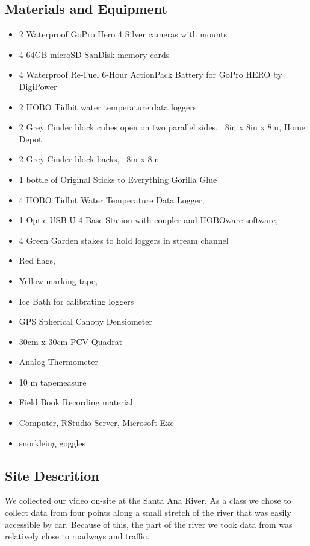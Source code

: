 \documentclass{article}\usepackage[]{graphicx}\usepackage[]{color}
\begin{document}
\subsection{Materials and Equipment}
\begin{itemize}
\item 2 Waterproof GoPro Hero 4 Silver cameras with mounts
\item 4 64GB microSD SanDisk memory cards
\item 4 Waterproof Re-Fuel 6-Hour ActionPack Battery for GoPro HERO by DigiPower
\item 2 HOBO Tidbit water temperature data loggers
\item 2 Grey Cinder block cubes open on two parallel sides, ~8in x 8in x 8in, Home Depot
\item 2 Grey Cinder block backs, ~8in x 8in
\item 1 bottle of Original Sticks to Everything Gorilla Glue
\item 4 HOBO Tidbit Water Temperature Data Logger,
\item 1 Optic USB U-4 Base Station with coupler and HOBOware software,
\item 4 Green Garden stakes to hold loggers in stream channel
\item Red flags,
\item Yellow marking tape,
\item Ice Bath for calibrating loggers
\item GPS Spherical Canopy Densiometer
\item 30cm x 30cm PCV Quadrat
\item Analog Thermometer
\item 10 m tapemeasure
\item Field Book Recording material
\item Computer, RStudio Server, Microsoft Exc
\item snorkleing goggles 

\end{itemize}

\subsection{Site Descrition}

We collected our video on-site at the Santa Ana River. As a class we chose to collect data from four points along a small stretch of the river that was easily accessible by car. Because of this, the part of the river we took data from was relatively close to roadways and traffic. 
\end{document}
